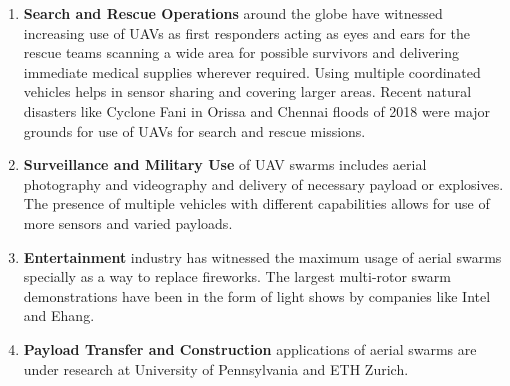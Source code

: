 \begin{spacing}{2}
\begin{enumerate}
    \item \textbf{Search and Rescue Operations} around the globe have witnessed increasing use of UAVs as first responders acting as eyes and ears for the rescue teams scanning a wide area for possible survivors and delivering immediate medical supplies wherever required. Using multiple coordinated vehicles helps in sensor sharing and covering larger areas. Recent natural disasters like Cyclone Fani in Orissa and Chennai floods of 2018 were major grounds for use of UAVs for search and rescue missions.
    \item \textbf{Surveillance and Military Use} of UAV swarms includes aerial photography and videography and delivery of necessary payload or explosives. The presence of multiple vehicles with different capabilities allows for use of more sensors and varied payloads.
    \item \textbf{Entertainment} industry has witnessed the maximum usage of aerial swarms specially as a way to replace fireworks. The largest multi-rotor swarm demonstrations have been in the form of light shows by companies like Intel and Ehang.
    \item \textbf{Payload Transfer and Construction} applications of aerial swarms are under research at University of Pennsylvania and ETH Zurich.
\end{enumerate}


\end{spacing}
